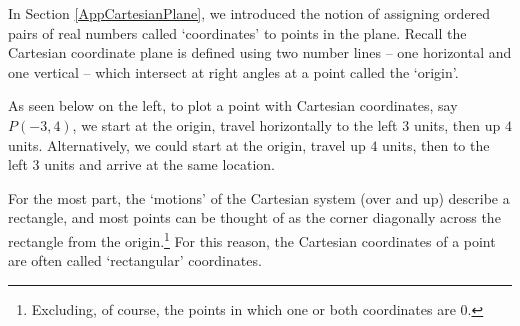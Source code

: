 \documentclass{ximera}
\begin{document}
	\author{Stitz-Zeager}




\setcounter{footnote}{0}

\label{PolarCoordinates}

In Section \ref{AppCartesianPlane}, we introduced the notion of assigning ordered pairs of real numbers called `coordinates'  to points in the plane.  Recall the Cartesian coordinate plane  is defined using two number lines -- one horizontal and one vertical -- which intersect at right angles at a point called the `origin'.   


 

As seen below on the left, to plot a point with Cartesian coordinates, say $P(-3,4)$, we start at the origin, travel horizontally to the left $3$ units, then up $4$ units. Alternatively, we could start at the origin, travel up $4$ units, then to the left $3$ units and arrive at the same location. 

 

For the most part, the `motions' of the Cartesian system (over and up) describe a rectangle, and most points can be thought of as the corner diagonally across the rectangle from the origin.\footnote{Excluding, of course, the points in which one or both coordinates are $0$.}  For this reason, the Cartesian coordinates of a point are often called    `rectangular' coordinates.  
\end{document}
